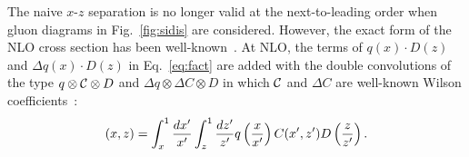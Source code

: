 The naive $x$-$z$ separation is no longer valid at the next-to-leading order
when gluon diagrams in Fig.~\ref{fig:sidis} are considered. However, the exact form of 
the NLO cross section has been well-known~\cite{graudenz}. 
At NLO,  
the terms of $q(x)\cdot D(z)$ and $\Delta q(x) \cdot D(z)$ in Eq.~\ref{eq:fact} are added 
with the double convolutions of the type $q \otimes {\cal C} \otimes D$ and $\Delta q \otimes \Delta C \otimes D$
in which ${\cal C}$ and $\Delta C$ are well-known Wilson coefficients~\cite{wilson}: 
 \begin{eqnarray}
  [q \otimes C \otimes D](x,z)= \int_x^1 { dx^\prime \over x^\prime} \int_z^1 {d z^\prime \over z^\prime}
 q \left( {x \over x^\prime} \right) C(x^\prime, z^\prime) D \left( {z \over z^\prime} \right).
\label{eq:nlo}  
\end{eqnarray}
 

